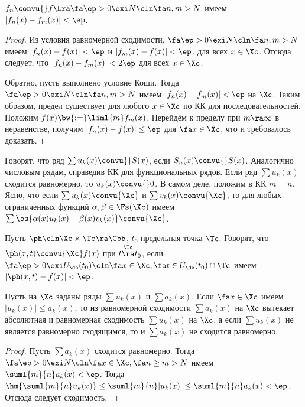 \documentclass[a4paper]{article}
\begin{document}
\begin{theorem}
$f_n \convu{} f \Lra \fa \ep > 0 \exi N\cln \fa n,m > N$ имеем $|f_n(x) - f_m(x)| < \ep$.
\end{theorem}
\begin{proof}
Из условия равномерной сходимости, $\fa \ep > 0 \exi N\cln \fa n, m > N$ имеем $|f_n(x) - f(x)| < \ep$ и $|f_m(x) - f(x)| < \ep$.
для всех $x \in \Xc$. Отсюда следует, что $|f_n(x) - f_m(x)| < 2\ep$ для всех $x \in \Xc$.

Обратно, пусть выполнено условие Коши. Тогда $\fa \ep > 0 \exi N\cln \fa n,m > N$ имеем $|f_n(x) - f_m(x)| < \ep$ на $\Xc$. Таким образом,
предел существует для любого $x \in \Xc$ по КК для последовательностей. Положим $f(x) \bw{:=} \liml{m} f_m(x)$. Перейдём к пределу при $m \ra \infty$ в неравенстве,
получим $|f_n(x) - f(x)| \le \ep$ для $\fa x \in \Xc$, что и требовалось доказать.
\end{proof}

Говорят, что ряд $\sum u_k(x)\convu{} S(x)$, если $S_n(x)\convu{}S(x)$. Аналогично числовым рядам, справедив КК для
функциональных рядов. Если ряд $\sum u_k(x)$ сходится равномерно, то $u_k(x)\convu{}0$. В самом деле, положим в КК $m=n$.
Ясно, что если $\sum u_k(x) \convu{\Xc}$ и $\sum v_k(x)\convu{\Xc}$, то для любых ограниченных функций
$\alpha, \beta \in \Fs(\Xc)$ имеем $\sum \bs{\alpha(x)u_k(x) + \beta(x)v_k(x)} \convu{\Xc}$.

\begin{df}
Пусть $\ph\cln \Xc \times \Tc \ra \Cbb$, $t_0$ предельная точка $\Tc$. Говорят, что $\ph(x,t) \convu{\Xc} f(x)$ при
$t \overset{\Tc}{\ra} t_0$, если $\fa \ep > 0 \exi U_\de(t_0)\cln \fa x \in \Xc, \fa t \in \dot{U}_\de(t_0) \cap \Tc$ имеем $|\ph(x,t)-f(x)| < \ep$.
\end{df}

\begin{theorem}
Пусть на $\Xc$ заданы ряды $\sum u_k(x)$ и $\sum a_k(x)$. Если $\fa x \in \Xc$ имеем $|u_k(x)| \le a_k(x)$,
то из равномерной сходимости $\sum a_k(x)$ на $\Xc$ вытекает абсолютная и равномерная сходимость $\sum u_k(x)$ на $\Xc$, а если
$\sum u_k(x)$ не является равномерно сходящимся, то и $\sum a_k(x)$ не сходится равномерно.
\end{theorem}
\begin{proof}
Пусть $\sum a_k(x)$ сходится равномерно. Тогда $\fa \ep > 0 \exi N\cln \fa x \in \Xc,\fa n \ge m > N$ имеем $\suml{m}{n} a_k(x) < \ep$. Тогда
$\hm{\suml{m}{n} u_k(x)} \le \suml{m}{n}|u_k(x)|\le \suml{m}{n} a_k(x) < \ep$. Отсюда следует сходимость.
\end{proof}
\end{document}

